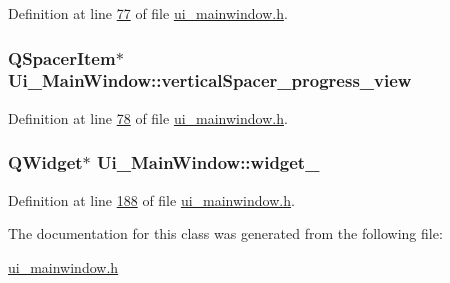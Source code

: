 Definition at line \hyperlink{a00052_source_l00077}{77} of file \hyperlink{a00052_source}{ui\+\_\+mainwindow.\+h}.

\hypertarget{a00027_a1c7dd277b3eb0ab06b980e95e1b0be29}{
\subsubsection[{vertical\+Spacer\+\_\+progress\+\_\+view}]{\setlength{\rightskip}{0pt plus 5cm}Q\+Spacer\+Item$\ast$ Ui\+\_\+\+Main\+Window\+::vertical\+Spacer\+\_\+progress\+\_\+view}}\label{a00027_a1c7dd277b3eb0ab06b980e95e1b0be29}


Definition at line \hyperlink{a00052_source_l00078}{78} of file \hyperlink{a00052_source}{ui\+\_\+mainwindow.\+h}.

\hypertarget{a00027_a7e6140f8a0c9dd88512918a04bc46441}{
\subsubsection[{widget\+\_\+20}]{\setlength{\rightskip}{0pt plus 5cm}Q\+Widget$\ast$ Ui\+\_\+\+Main\+Window\+::widget\+\_}}\label{a00027_a7e6140f8a0c9dd88512918a04bc46441}


Definition at line \hyperlink{a00052_source_l00188}{188} of file \hyperlink{a00052_source}{ui\+\_\+mainwindow.\+h}.



The documentation for this class was generated from the following file\+:\begin{DoxyCompactItemize}
\item 
\hyperlink{a00052}{ui\+\_\+mainwindow.\+h}\end{DoxyCompactItemize}
